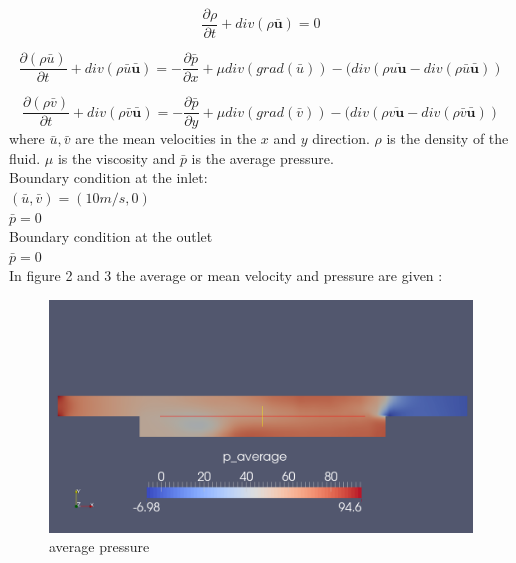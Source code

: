 \documentclass[10pt,a4paper]{report}
\begin{document}
\begin{equation}
\frac{\partial\rho}{\partial t}+ div{(\rho\bar{\textbf{u}})}= 0
\end{equation}


\begin{equation}
\frac{\partial(\rho\bar{u})}{\partial t} +div(\rho\bar{u}\bar{\textbf{u}})=
-\frac{\partial \bar{p}}{\partial x}+\mu div(grad(\bar{u}))-(div(\rho\overline{u\textbf{u}}-div(\rho \bar{u}\bar{\textbf{u}}))
\end{equation}

\begin{equation}
\frac{\partial(\rho\bar{v})}{\partial t} +div(\rho\bar{v}\bar{\textbf{u}})=
-\frac{\partial \bar{p}}{\partial y}+\mu div(grad(\bar{v}))-(div(\rho\overline{v\textbf{u}}-div(\rho \bar{v}\bar{\textbf{u}}))
\end{equation}
where $\bar{u}, \bar{v}$ are the mean velocities in the $x$ and $y$ direction. $\rho$ is the density of the fluid. $\mu$ is the viscosity and $\bar{p}$ is the average pressure.\\
Boundary condition at the inlet:\\
$(\bar{u},\bar{v}) = (10 m/s, 0)$ \\
$\bar{p}=0$\\
Boundary condition at the outlet\\
$\bar{p}= 0$\\


 In figure 2 and 3 the average or mean velocity and pressure are given :

\begin{figure}[H]
  \caption{average pressure}
  \centering
    \includegraphics[width=1\textwidth]{average_P_pisofoam.png}
\end{figure}
\end{document}
